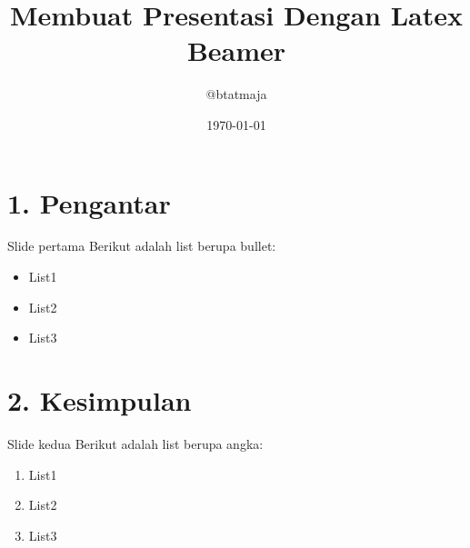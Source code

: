 \documentclass{beamer}
\title{Membuat Presentasi Dengan Latex Beamer}
\author{@btatmaja}
\date{\today}
\begin{document}
	\frame{\titlepage}
	
\section {1. Pengantar}
\begin{frame}[t, fragile]{Slide pertama}
Berikut adalah list berupa bullet:
\begin{itemize}
\item List1
\item List2
\item List3
\end{itemize}
\end{frame}

\section{2. Kesimpulan}
\begin{frame}[t, fragile]{Slide kedua}
Berikut adalah list berupa angka:
\begin{enumerate}
\item List1
\item List2
\item List3
\end{enumerate}
\end{frame}
\end{document}
